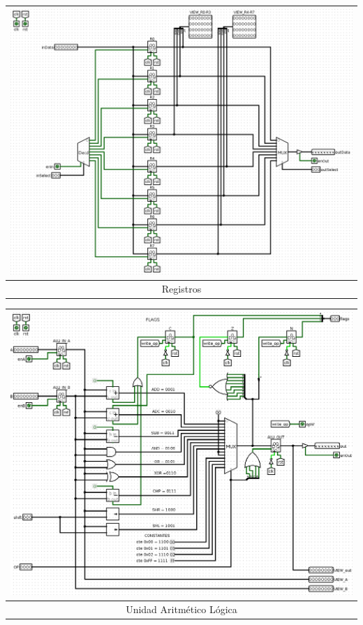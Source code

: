 \documentclass[a4paper,11pt]{article}
\begin{document}
\vspace{0.5cm}

\begin{center}
\begin{tabular}[t]{c}
\includegraphics[scale=0.3]{img/1_registers.png} \\
\hline
Registros\\ \hline
\end{tabular}
\end{center}

\vspace{0.5cm}

\begin{center}
 \begin{tabular}[t]{c}
\includegraphics[scale=0.3]{img/4_ALU.png} \\
\hline
Unidad Aritmético Lógica\\ \hline
\end{tabular}
\end{center}
\end{document}
